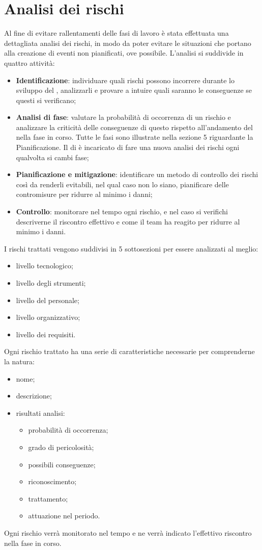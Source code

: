 \documentclass[PianoDiProgetto.tex]{subfiles}
\begin{document}
\section{Analisi dei rischi}
Al fine di evitare rallentamenti delle fasi di lavoro è stata effettuata una dettagliata analisi dei rischi, in modo da poter evitare le situazioni che portano alla creazione di eventi non pianificati, ove possibile. L'analisi si suddivide in quattro attività:
	\begin{itemize}
		\item \textbf{Identificazione}: individuare quali rischi possono incorrere durante lo sviluppo del , analizzarli e provare a intuire quali saranno le conseguenze se questi si verificano;
		\item \textbf{Analisi di fase}: valutare la probabilità di occorrenza di un rischio e analizzare la criticità delle conseguenze di questo rispetto all'andamento del  nella fase in corso. Tutte le fasi sono illustrate nella sezione 5 riguardante la Pianificazione. Il \RESP{} di  è incaricato  di fare una nuova analisi dei rischi ogni qualvolta si cambi fase;
		\item \textbf{Pianificazione e mitigazione}: identificare un metodo di controllo dei rischi così da renderli evitabili, nel qual caso non lo siano, pianificare delle contromisure per ridurre al minimo i danni; 
		\item \textbf{Controllo}: monitorare nel tempo ogni rischio, e nel caso si verifichi descriverne il riscontro effettivo e come il team ha reagito per ridurre al minimo i danni. 
	\end{itemize}
I rischi trattati vengono suddivisi in 5 sottosezioni per essere analizzati al meglio:
	\begin{itemize}
		\item livello tecnologico;
		\item livello degli strumenti;
		\item livello del personale;
		\item livello organizzativo;
		\item livello dei requisiti.
	\end{itemize}
Ogni rischio trattato ha una serie di caratteristiche necessarie per comprenderne la natura:
	\begin{itemize}
		\item nome;
		\item descrizione;
		\item risultati analisi:
			\begin{itemize}
				\item probabilità di occorrenza;
				\item grado di pericolosità;
				\item possibili conseguenze;
				\item riconoscimento;
				\item trattamento;
				\item attuazione nel periodo.
			\end{itemize}
	\end{itemize}
Ogni rischio verrà monitorato nel tempo e ne verrà indicato l'effettivo riscontro nella fase in corso.
\end{document}
